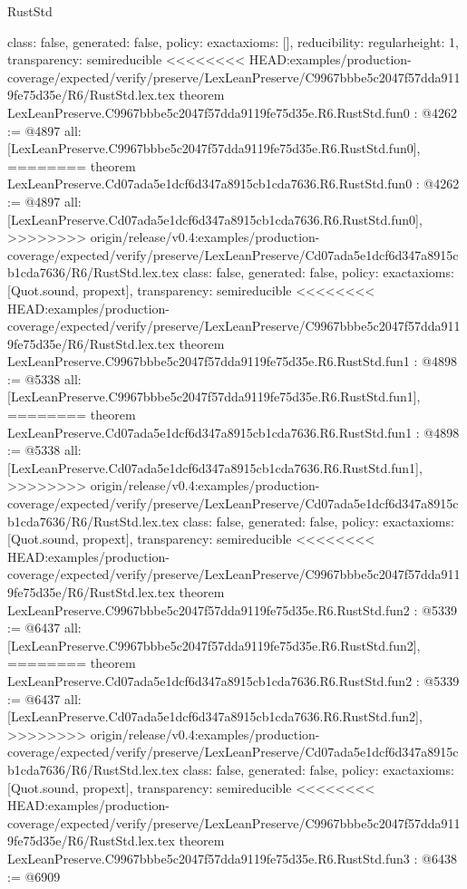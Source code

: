 \begin{lexlean}{RustStd}
\begin{coremodule}
{\begin{coremodule}
{{{  class: false,
  generated: false,
  policy: exact{axioms: []},
  reducibility: regular{height: 1},
  transparency: semireducible
}
<<<<<<<< HEAD:examples/production-coverage/expected/verify/preserve/LexLeanPreserve/C9967bbbe5c2047f57dda9119fe75d35e/R6/RustStd.lex.tex
theorem LexLeanPreserve.C9967bbbe5c2047f57dda9119fe75d35e.R6.RustStd.fun0 : @4262 := @4897 {
  all: [LexLeanPreserve.C9967bbbe5c2047f57dda9119fe75d35e.R6.RustStd.fun0],
========
theorem LexLeanPreserve.Cd07ada5e1dcf6d347a8915cb1cda7636.R6.RustStd.fun0 : @4262 := @4897 {
  all: [LexLeanPreserve.Cd07ada5e1dcf6d347a8915cb1cda7636.R6.RustStd.fun0],
>>>>>>>> origin/release/v0.4:examples/production-coverage/expected/verify/preserve/LexLeanPreserve/Cd07ada5e1dcf6d347a8915cb1cda7636/R6/RustStd.lex.tex
  class: false,
  generated: false,
  policy: exact{axioms: [Quot.sound, propext]},
  transparency: semireducible
}
<<<<<<<< HEAD:examples/production-coverage/expected/verify/preserve/LexLeanPreserve/C9967bbbe5c2047f57dda9119fe75d35e/R6/RustStd.lex.tex
theorem LexLeanPreserve.C9967bbbe5c2047f57dda9119fe75d35e.R6.RustStd.fun1 : @4898 := @5338 {
  all: [LexLeanPreserve.C9967bbbe5c2047f57dda9119fe75d35e.R6.RustStd.fun1],
========
theorem LexLeanPreserve.Cd07ada5e1dcf6d347a8915cb1cda7636.R6.RustStd.fun1 : @4898 := @5338 {
  all: [LexLeanPreserve.Cd07ada5e1dcf6d347a8915cb1cda7636.R6.RustStd.fun1],
>>>>>>>> origin/release/v0.4:examples/production-coverage/expected/verify/preserve/LexLeanPreserve/Cd07ada5e1dcf6d347a8915cb1cda7636/R6/RustStd.lex.tex
  class: false,
  generated: false,
  policy: exact{axioms: [Quot.sound, propext]},
  transparency: semireducible
}
<<<<<<<< HEAD:examples/production-coverage/expected/verify/preserve/LexLeanPreserve/C9967bbbe5c2047f57dda9119fe75d35e/R6/RustStd.lex.tex
theorem LexLeanPreserve.C9967bbbe5c2047f57dda9119fe75d35e.R6.RustStd.fun2 : @5339 := @6437 {
  all: [LexLeanPreserve.C9967bbbe5c2047f57dda9119fe75d35e.R6.RustStd.fun2],
========
theorem LexLeanPreserve.Cd07ada5e1dcf6d347a8915cb1cda7636.R6.RustStd.fun2 : @5339 := @6437 {
  all: [LexLeanPreserve.Cd07ada5e1dcf6d347a8915cb1cda7636.R6.RustStd.fun2],
>>>>>>>> origin/release/v0.4:examples/production-coverage/expected/verify/preserve/LexLeanPreserve/Cd07ada5e1dcf6d347a8915cb1cda7636/R6/RustStd.lex.tex
  class: false,
  generated: false,
  policy: exact{axioms: [Quot.sound, propext]},
  transparency: semireducible
}
<<<<<<<< HEAD:examples/production-coverage/expected/verify/preserve/LexLeanPreserve/C9967bbbe5c2047f57dda9119fe75d35e/R6/RustStd.lex.tex
theorem LexLeanPreserve.C9967bbbe5c2047f57dda9119fe75d35e.R6.RustStd.fun3 : @6438 := @6909 {
}}}}}}
\end{coremodule}}
\end{coremodule}
\end{lexlean}
